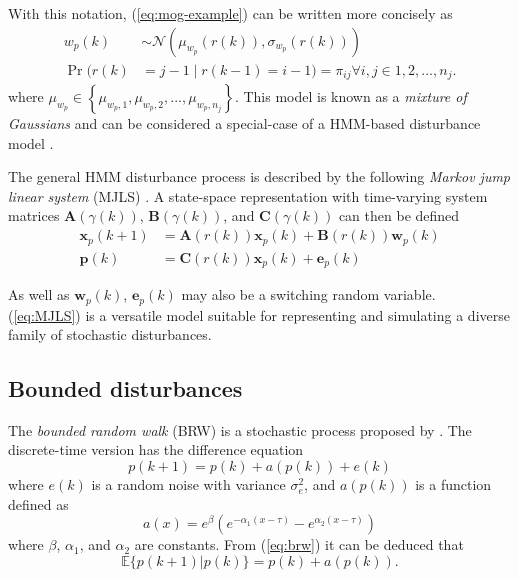 With this notation, (\ref{eq:mog-example}) can be written more concisely as
\begin{equation} \label{eq:mog-example2}
	\begin{aligned}
		w_p(k) &\sim \mathcal{N}\left(\mu_{w_p}(r(k)), \sigma_{w_p}(r(k))\right) \\
		\Pr(r(k) &= j-1 \mid r(k-1)=i-1)=\pi_{ij} \forall i,j \in {1,2,...,n_j}.
	\end{aligned}
\end{equation}
where $\mu_{w_p}\in\left\{\mu_{w_p,1},\mu_{w_p,2},...,\mu_{w_p,n_j}\right\}$. This model is known as a \textit{mixture of Gaussians} and can be considered a special-case of a HMM-based disturbance model \citep{wong_disturbance_2007}.

The general HMM disturbance process is described by the following \textit{Markov jump linear system} (MJLS) \citep{costa_discrete-time_2005}. A state-space representation with time-varying system matrices $\mathbf{A}(\gamma(k))$, $\mathbf{B}(\gamma(k))$, and $\mathbf{C}(\gamma(k))$ can then be defined
\begin{equation} \label{eq:MJLS}
	\begin{aligned}
	\mathbf{x}_p(k+1) &= \mathbf{A}(r(k)) \mathbf{x}_p(k) + \mathbf{B}(r(k))\mathbf{w}_p(k) \\
	\mathbf{p}(k) &= \mathbf{C}(r(k)) \mathbf{x}_p(k) + \mathbf{e}_p(k)
	\end{aligned}
\end{equation}

As well as $\mathbf{w}_p(k)$, $\mathbf{e}_p(k)$ may also be a switching random variable. (\ref{eq:MJLS}) is a versatile model suitable for representing and simulating a diverse family of stochastic disturbances.

\subsection{Bounded disturbances}

The \textit{bounded random walk} (\gls{BRW}) is a stochastic process proposed by \cite{nicolau_stationary_2002}. The discrete-time version has the difference equation
\begin{equation} \label{eq:brw}
		p(k+1) = p(k) + a(p(k)) + e(k)
\end{equation}
where $e(k)$ is a random noise with variance $\sigma_e^2$, and $a(p(k))$ is a function defined as
\begin{equation}
	a(x) = e^{\beta}\left(e^{-\alpha_{1}\left(x - \tau\right)} - e^{\alpha_{2}\left(x - \tau\right)}\right)
\end{equation}
where $\beta$, $\alpha_{1}$, and $\alpha_{2}$ are constants.  From (\ref{eq:brw}) it can be deduced that
\begin{equation}
	\mathbb{E}\{p(k+1)|p(k)\} = p(k) + a(p(k)).
\end{equation}

